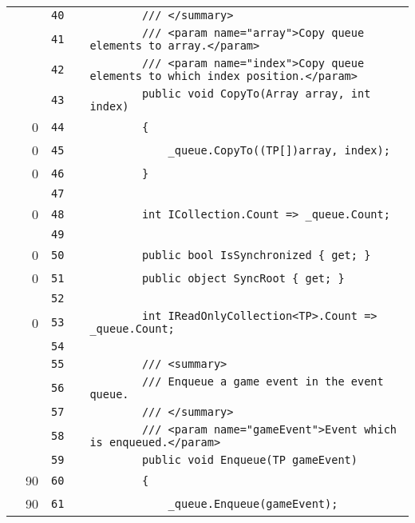 \documentclass[a4paper,landscape,10pt]{article}
\begin{document}
\begin{longtable}[l]{lrrll}
\cellcolor{gray} &  & \verb~40~ & & \verb~        /// </summary>~\\
\cellcolor{gray} &  & \verb~41~ & & \verb~        /// <param name="array">Copy queue elements to array.</param>~\\
\cellcolor{gray} &  & \verb~42~ & & \verb~        /// <param name="index">Copy queue elements to which index position.</param>~\\
\cellcolor{gray} &  & \verb~43~ & & \verb~        public void CopyTo(Array array, int index)~\\
\cellcolor{red} & 0 & \verb~44~ & & \verb~        {~\\
\cellcolor{red} & 0 & \verb~45~ & & \verb~            _queue.CopyTo((TP[])array, index);~\\
\cellcolor{red} & 0 & \verb~46~ & & \verb~        }~\\
\cellcolor{gray} &  & \verb~47~ & & \verb~~\\
\cellcolor{red} & 0 & \verb~48~ & & \verb~        int ICollection.Count => _queue.Count;~\\
\cellcolor{gray} &  & \verb~49~ & & \verb~~\\
\cellcolor{red} & 0 & \verb~50~ & & \verb~        public bool IsSynchronized { get; }~\\
\cellcolor{red} & 0 & \verb~51~ & & \verb~        public object SyncRoot { get; }~\\
\cellcolor{gray} &  & \verb~52~ & & \verb~~\\
\cellcolor{red} & 0 & \verb~53~ & & \verb~        int IReadOnlyCollection<TP>.Count => _queue.Count;~\\
\cellcolor{gray} &  & \verb~54~ & & \verb~~\\
\cellcolor{gray} &  & \verb~55~ & & \verb~        /// <summary>~\\
\cellcolor{gray} &  & \verb~56~ & & \verb~        /// Enqueue a game event in the event queue.~\\
\cellcolor{gray} &  & \verb~57~ & & \verb~        /// </summary>~\\
\cellcolor{gray} &  & \verb~58~ & & \verb~        /// <param name="gameEvent">Event which is enqueued.</param>~\\
\cellcolor{gray} &  & \verb~59~ & & \verb~        public void Enqueue(TP gameEvent)~\\
\cellcolor{green} & 90 & \verb~60~ & & \verb~        {~\\
\cellcolor{green} & 90 & \verb~61~ & & \verb~            _queue.Enqueue(gameEvent);~\\

\end{longtable}
\end{document}
